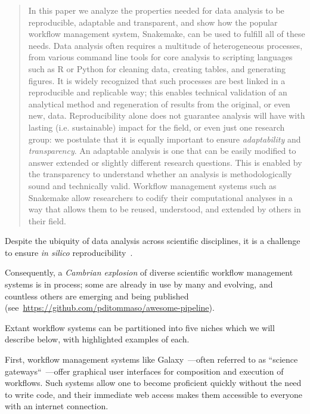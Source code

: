 \documentclass[parskip=half]{scrartcl}
\let\plainurl\url
\renewcommand{\url}[1]{\protect\plainurl{#1}}
\begin{document}
\begin{abstract}
	In this paper we analyze the properties needed for data analysis to be reproducible, adaptable and transparent, and show how the popular workflow management system, Snakemake, can be used to fulfill all of these needs.
	Data analysis often requires a multitude of heterogeneous processes, from various command line tools for core analysis to scripting languages such as R or Python for cleaning data, creating tables, and generating figures. 
    It is widely recognized that such processes are best linked in a reproducible and replicable way; this enables technical validation of an analytical method and regeneration of results from the original, or even new, data.
	Reproducibility alone does not guarantee analysis will have with lasting (i.e. sustainable) impact for the field, or even just one research group: we postulate that it is equally important to ensure \emph{adaptability} and \emph{transparency}. An adaptable analysis is one that can be easily modified to answer extended or slightly different research questions. This is enabled by the transparency to understand whether an analysis is methodologically sound and technically valid.
	Workflow management systems such as Snakemake allow researchers to codify their computational analyses in a way that allows them to be reused, understood, and extended by others in their field. 
\end{abstract}

Despite the ubiquity of data analysis across scientific disciplines, it is a challenge to ensure \emph{in silico} reproducibility~\parencite{Mesirov2010,Baker2016,Munaf__2017}.

Consequently, a \emph{Cambrian explosion} of diverse scientific workflow management systems is in process; some are already in use by many and evolving, and countless others are emerging and being published (see~\url{https://github.com/pditommaso/awesome-pipeline}).

Extant workflow systems can be partitioned into five niches which we will describe below, with highlighted examples of each.

First, workflow management systems like Galaxy~\parencite{Afgan2018}---often referred to as ``science gateways``~\parencite{Afgan2011-tv}---offer graphical user interfaces for composition and execution of workflows. Such systems allow one to become proficient quickly without the need to write code, and their immediate web access makes them accessible to everyone with an internet connection.
\end{document}
